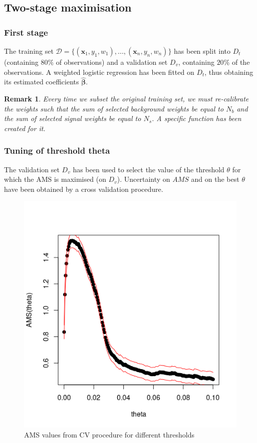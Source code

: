 \documentclass[]{article}
\newcommand{\bbeta}{\boldsymbol \beta}
\newtheorem{remark}[theorem]{Remark}
\begin{document}
\subsection{Two-stage maximisation}

\subsubsection{First stage}
The training set $\mathcal{D} = \{(\bm{x}_1, y_1,w_1),...,(\bm{x}_n,y_n,w_n)\}$ has been split into $D_t$ (containing $80\%$ of observations) and a validation set $D_v$, containing $20\%$ of the observations. A weighted logistic regression has been fitted on $D_t$, thus obtaining its estimated coefficients $\hat{\bbeta}$.

\begin{remark}
Every time we subset the original training set, we must re-calibrate the weights such that the sum of selected background weights be equal to $N_b$ and the sum of selected signal weights be equal to $N_s$. A specific function has been created for it.
\end{remark} 



\subsubsection{Tuning of threshold theta}
The validation set $D_v$ has been used to select the value of the threshold $\theta$ for which the AMS is maximised (on $D_v$). Uncertainty on $AMS$ and on the best $\theta$ have been obtained by a cross validation procedure.


\begin{figure}[H]
\centering
\includegraphics[scale=0.7]{../Pictures/traintunedtheta.png}
\caption{AMS values from CV procedure for different thresholds}
\label{fig: train_tuned_theta}
\end{figure}
\end{document}
